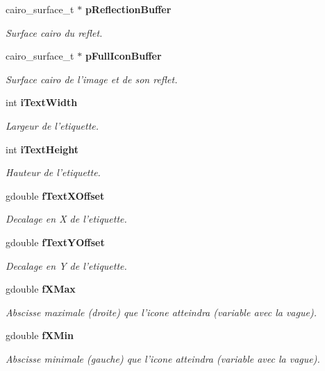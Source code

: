 \begin{CompactItemize}
cairo\_\-surface\_\-t $\ast$ {\bf pReflectionBuffer}
\begin{CompactList}\small\item\em Surface cairo du reflet. \item\end{CompactList}\item 
cairo\_\-surface\_\-t $\ast$ {\bf pFullIconBuffer}
\begin{CompactList}\small\item\em Surface cairo de l'image et de son reflet. \item\end{CompactList}\item 
int {\bf iTextWidth}
\begin{CompactList}\small\item\em Largeur de l'etiquette. \item\end{CompactList}\item 
int {\bf iTextHeight}
\begin{CompactList}\small\item\em Hauteur de l'etiquette. \item\end{CompactList}\item 
gdouble {\bf fTextXOffset}
\begin{CompactList}\small\item\em Decalage en X de l'etiquette. \item\end{CompactList}\item 
gdouble {\bf fTextYOffset}
\begin{CompactList}\small\item\em Decalage en Y de l'etiquette. \item\end{CompactList}\item 
gdouble {\bf fXMax}
\begin{CompactList}\small\item\em Abscisse maximale (droite) que l'icone atteindra (variable avec la vague). \item\end{CompactList}\item 
gdouble {\bf fXMin}
\begin{CompactList}\small\item\em Abscisse minimale (gauche) que l'icone atteindra (variable avec la vague). \item\end{CompactList}\item 

\end{CompactItemize}
